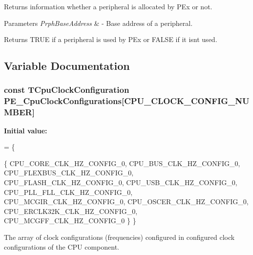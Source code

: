 Returns information whether a peripheral is allocated by P\+Ex or not. 


\begin{DoxyParams}{Parameters}
{\em Prph\+Base\+Address} & -\/ Base address of a peripheral. \\
\hline
\end{DoxyParams}
\begin{DoxyReturn}{Returns}
T\+R\+UE if a peripheral is used by P\+Ex or F\+A\+L\+SE if it isn\textquotesingle{}t used. 
\end{DoxyReturn}


\subsection{Variable Documentation}
\subsubsection[{\texorpdfstring{P\+E\+\_\+\+Cpu\+Clock\+Configurations}{PE_CpuClockConfigurations}}]{\setlength{\rightskip}{0pt plus 5cm}const T\+Cpu\+Clock\+Configuration P\+E\+\_\+\+Cpu\+Clock\+Configurations\mbox{[}C\+P\+U\+\_\+\+C\+L\+O\+C\+K\+\_\+\+C\+O\+N\+F\+I\+G\+\_\+\+N\+U\+M\+B\+ER\mbox{]}}\hypertarget{group___p_e___l_d_d__module_gab69281f0e90d16198a5595ed7f471441}{}\label{group___p_e___l_d_d__module_gab69281f0e90d16198a5595ed7f471441}
{\bfseries Initial value\+:}
\begin{DoxyCode}
= \{
  
  \{
    CPU\_CORE\_CLK\_HZ\_CONFIG\_0,          
    CPU\_BUS\_CLK\_HZ\_CONFIG\_0,           
    CPU\_FLEXBUS\_CLK\_HZ\_CONFIG\_0,       
    CPU\_FLASH\_CLK\_HZ\_CONFIG\_0,         
    CPU\_USB\_CLK\_HZ\_CONFIG\_0,           
    CPU\_PLL\_FLL\_CLK\_HZ\_CONFIG\_0,       
    CPU\_MCGIR\_CLK\_HZ\_CONFIG\_0,         
    CPU\_OSCER\_CLK\_HZ\_CONFIG\_0,         
    CPU\_ERCLK32K\_CLK\_HZ\_CONFIG\_0,      
    CPU\_MCGFF\_CLK\_HZ\_CONFIG\_0          
  \}
\}
\end{DoxyCode}
The array of clock configurations (frequencies) configured in configured clock configurations of the C\+PU component. 

